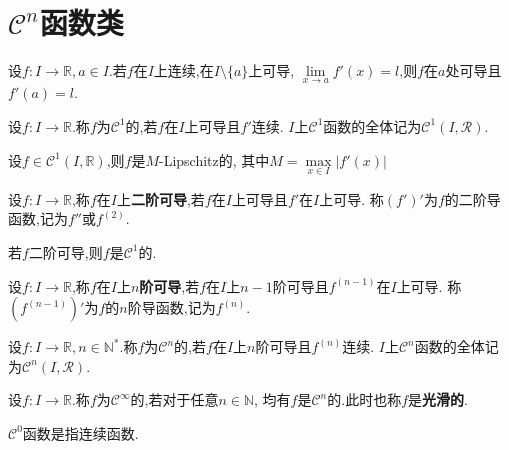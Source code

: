 \section{$\mathcal{C}^n$函数类}

\begin{prop}
    设$f:I\to\mathbb{R},a\in I$.若$f$在$I$上连续,在$I\setminus\{a\}$上可导,
    $\lim\limits_{x\to a}f'(x)=l$,则$f$在$a$处可导且$f'(a)=l$.
\end{prop}

\begin{deff}
    设$f:I\to\mathbb{R}$.称$f$为$\mathcal{C}^1$的,若$f$在$I$上可导且$f'$连续.
    $I$上$\mathcal{C}^1$函数的全体记为$\mathcal{C}^1(I,\mathcal{R})$.
\end{deff}

\begin{thm}
    设$f\in\mathcal{C}^1(I,\mathbb{R})$,则$f$是$M$-Lipschitz的,
    其中$M=\max\limits_{x\in I}\left\lvert f'(x) \right\rvert$
\end{thm}

\begin{deff}
    设$f:I\to\mathbb{R}$,称$f$在$I$上\textbf{二阶可导},若$f$在$I$上可导且$f'$在$I$上可导.
    称$(f')'$为$f$的二阶导函数,记为$f''$或$f^{(2)}$.
\end{deff}

\begin{prop}
    若$f$二阶可导,则$f$是$\mathcal{C}^1$的.
\end{prop}

\begin{deff}
    设$f:I\to\mathbb{R}$,称$f$在$I$上$n$\textbf{阶可导},若$f$在$I$上$n-1$阶可导且$f^{(n-1)}$在$I$上可导.
    称$(f^{(n-1)})'$为$f$的$n$阶导函数,记为$f^{(n)}$.
\end{deff}

\begin{deff}
    设$f:I\to\mathbb{R},n\in\mathbb{N}^*$.称$f$为$\mathcal{C}^n$的,若$f$在$I$上$n$阶可导且$f^{(n)}$连续.
    $I$上$\mathcal{C}^n$函数的全体记为$\mathcal{C}^n(I,\mathcal{R})$.
\end{deff}

\begin{deff}
    设$f:I\to\mathbb{R}$.称$f$为$\mathcal{C}^{\infty}$的,若对于任意$n\in\mathbb{N}$,
    均有$f$是$\mathcal{C}^n$的.此时也称$f$是\textbf{光滑的}.
\end{deff}

\begin{rqq}
    $\mathcal{C}^0$函数是指连续函数.
\end{rqq}

